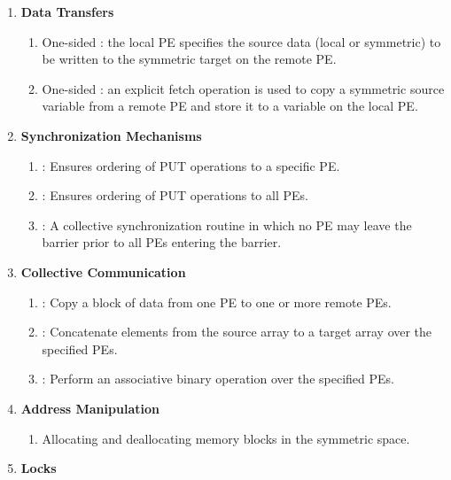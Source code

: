 \begin{enumerate}
\item \textbf{Data Transfers }

\begin{enumerate}
\item One-sided  : the local \ac{PE} specifies the source
data (local or symmetric) to be written to the symmetric target on the remote \ac{PE}. 
\item One-sided  : an explicit fetch operation is used to copy a symmetric source variable
from a remote \ac{PE} and store it to a variable on the local \ac{PE}.\end{enumerate}

\item \textbf{Synchronization Mechanisms }
\begin{enumerate}
\item {}: Ensures ordering of PUT operations to a specific \ac{PE}. 
\item {}: Ensures ordering of PUT operations to all \ac{PE}s. 
\item {}: A collective synchronization routine in which no \ac{PE} may leave
the barrier prior to all \ac{PE}s entering the barrier. 
\end{enumerate}
\item \textbf{Collective Communication}

\begin{enumerate}
\item {}: Copy a block of data from one \ac{PE} to one or more remote
PEs. 
\item {}: Concatenate elements from the source array to a target
array over the specified \ac{PE}s. 
\item {}: Perform an associative binary operation over the specified
\ac{PE}s. 
\end{enumerate}
\item \textbf{Address Manipulation}

\begin{enumerate}
\item Allocating and deallocating memory blocks in the symmetric space.
\end{enumerate}
\item \textbf{Locks}


\end{enumerate}
